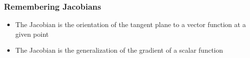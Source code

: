 \begin{frame}
    \frametitle{Remembering Jacobians}
    
    \begin{itemize}
    \item The Jacobian is the orientation of the tangent plane to a vector function at a given point
    \item The Jacobian is the generalization of the gradient of a scalar function
    \end{itemize}
    
    \begin{figure}[!h]
    \centering
    \hspace{1cm} 
    \end{figure}
    
    \begin{center}
    \end{center}
    
    
    \end{frame}
    
